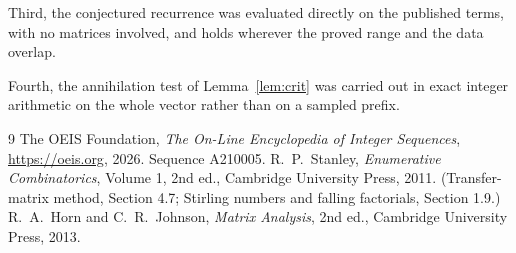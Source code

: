 \documentclass[11pt,a4paper]{article}
\theoremstyle{plain}
\theoremstyle{definition}
\begin{document}
Third, the conjectured recurrence was evaluated directly on the published terms, with no
matrices involved, and holds wherever the proved range and the data overlap.

Fourth, the annihilation test of Lemma~\ref{lem:crit} was carried out in exact integer
arithmetic on the whole vector rather than on a sampled prefix.

\begin{thebibliography}{9}
 The OEIS Foundation, \emph{The On-Line Encyclopedia of Integer
Sequences}, \url{https://oeis.org}, 2026. Sequence A210005.
 R.~P.~Stanley, \emph{Enumerative Combinatorics}, Volume 1, 2nd ed.,
Cambridge University Press, 2011. (Transfer-matrix method, Section 4.7; Stirling numbers and
falling factorials, Section 1.9.)
 R.~A.~Horn and C.~R.~Johnson, \emph{Matrix Analysis}, 2nd ed., Cambridge
University Press, 2013.
\end{thebibliography}
\end{document}
